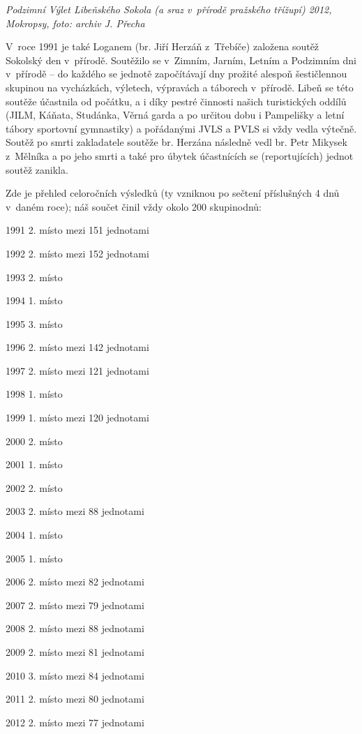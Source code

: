 \documentclass[a5paper, 12pt, twoside]{article}
\begin{document}

\textit{Podzimní Výlet Libeňského Sokola (a sraz v~přírodě pražského
třížupí) 2012, Mokropsy, foto: archiv J. Přecha}

V~roce 1991 je také Loganem (br. Jiří Herzáň z~Třebíče) založena soutěž
Sokolský den v~přírodě. Soutěžilo se v~Zimním, Jarním, Letním a
Podzimním dni v~přírodě -- do každého se jednotě započítávají dny
prožité alespoň šestičlennou skupinou na vycházkách, výletech, výpravách
a táborech v~přírodě. Libeň se této soutěže účastnila od počátku, a i
díky pestré činnosti našich turistických oddílů (JILM, Káňata, Studánka,
Věrná garda a po určitou dobu i Pampelišky a letní tábory sportovní
gymnastiky) a pořádanými JVLS a PVLS si vždy vedla výtečně. Soutěž po
smrti zakladatele soutěže br. Herzána následně vedl br. Petr Mikysek
z~Mělníka a po jeho smrti a také pro úbytek účastnících se (reportujících)
jednot soutěž zanikla.

Zde je přehled celoročních výsledků (ty vzniknou po sečtení příslušných
4 dnů v~daném roce); náš součet činil vždy okolo 200 skupinodnů:

1991 2. místo mezi 151 jednotami

1992 2. místo mezi 152 jednotami

1993 2. místo

1994 1. místo

1995 3. místo

1996 2. místo mezi 142 jednotami

1997 2. místo mezi 121 jednotami

1998 1. místo

1999 1. místo mezi 120 jednotami

2000 2. místo

2001 1. místo

2002 2. místo

2003 2. místo mezi 88 jednotami

2004 1. místo

2005 1. místo

2006 2. místo mezi 82 jednotami

2007 2. místo mezi 79 jednotami

2008 2. místo mezi 88 jednotami

2009 2. místo mezi 81 jednotami

2010 3. místo mezi 84 jednotami

2011 2. místo mezi 80 jednotami

2012 2. místo mezi 77 jednotami
\end{document}
